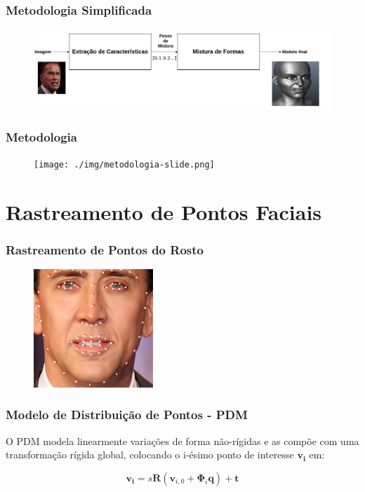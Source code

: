 \documentclass[brazil]{beamer}
\begin{document}
\begin{frame}
 	\frametitle{Metodologia Simplificada}
       \begin{figure}
         \centering
         \includegraphics[width = 1.1\textwidth]{./img/EZ3d-simplified.png}
       \end{figure}   
\end{frame}


\begin{frame}
	\frametitle{Metodologia}
      \begin{figure}
        \centering
        \texttt{[image: ./img/metodologia-slide.png]}
      \end{figure}   
\end{frame}

\section{Rastreamento de Pontos Faciais}

\begin{frame}
\frametitle{Rastreamento de Pontos do Rosto}
        \begin{figure}
            \centering
            \includegraphics[width = 0.4\textwidth, keepaspectratio]{./img/nick-marked.png}
      \end{figure}
\end{frame}


\begin{frame}
\frametitle{Modelo de Distribuição de Pontos - PDM}

\begin{definition}
  O PDM modela linearmente variações de forma não-rígidas e as compõe com uma transformação rígida global, colocando o i-ésimo ponto de interesse
$\bm{v_i}$ em:

\begin{equation}
 \bm{v_i} = s \bm{R} ( \bm{v}_{i,0} + \bm{\Phi}_i \bm{q}) + \bm{t}
\label{eq:PDM-equation}
\end{equation}
\end{definition}
\end{frame}
\end{document}
